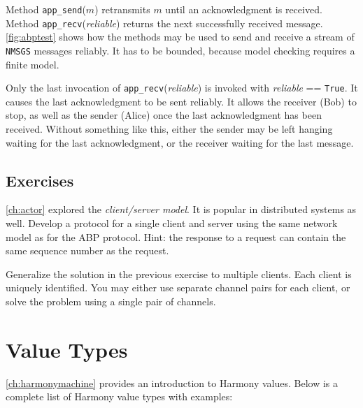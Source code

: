 \documentclass{report}
\begin{document}
Method \texttt{app\_send}($m$) retransmits $m$ until
an acknowledgment is received.
Method \texttt{app\_recv}(\textit{reliable}) returns the next successfully received
message.
\autoref{fig:abptest} shows how the methods may be used to send and receive
a stream of \texttt{NMSGS} messages reliably.
It has to be bounded, because model checking requires a finite model.

Only the last invocation of \texttt{app\_recv}(\textit{reliable}) is invoked with
\textit{reliable} == \texttt{True}.  It causes the last acknowledgment to be sent
reliably.  It allows the receiver (Bob) to stop, as well as the sender (Alice)
once the last acknowledgment has been received.
Without something like this, either the sender may be left hanging waiting
for the last acknowledgment, or the receiver waiting for the last message.

\section*{Exercises}
\begin{problems}
\item \autoref{ch:actor} explored the \emph{client/server model}.  It is popular
in distributed systems as well.
Develop a protocol for a single client and server using the same network
model as for the ABP protocol.
Hint: the response to a request can contain the same sequence number as the
request.
\item Generalize the solution in the previous exercise to multiple clients.
Each client is uniquely identified.  You may either use separate channel pairs
for each client, or solve the problem using a single pair of channels.
\end{problems}




\appendix

\chapter{Value Types}
\label{ap:values}

\autoref{ch:harmonymachine} provides an introduction to Harmony values.
Below is a complete list of Harmony value types with examples:
\end{document}
